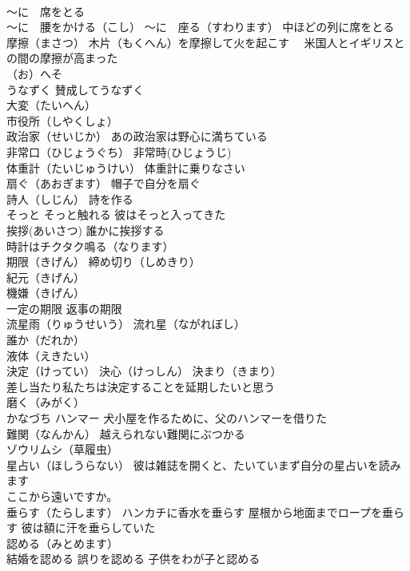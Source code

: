 \documentclass[8pt]{extreport}
\begin{document}
\begin{CJK}{UTF8}{min}
\\	～に　席をとる　
\\	～に　腰をかける（こし） ～に　座る（すわります） 中ほどの列に席をとる
\\	摩擦（まさつ） 木片（もくへん）を摩擦して火を起こす　 米国人とイギリスとの間の摩擦が高まった
\\	（お）へそ
\\	うなずく 賛成してうなずく
\\	大変（たいへん）
\\	市役所（しやくしょ）
\\	政治家（せいじか） あの政治家は野心に満ちている
\\	非常口（ひじょうぐち） 非常時(ひじょうじ)
\\	体重計（たいじゅうけい） 体重計に乗りなさい
\\	扇ぐ（あおぎます） 帽子で自分を扇ぐ
\\	詩人（しじん） 詩を作る
\\	そっと そっと触れる 彼はそっと入ってきた
\\	挨拶(あいさつ) 誰かに挨拶する
\\	時計はチクタク鳴る（なります）
\\	期限（きげん） 締め切り（しめきり）
\\	紀元（きげん）
\\	機嫌（きげん）
\\	一定の期限 返事の期限
\\	流星雨（りゅうせいう） 流れ星（ながれぼし）
\\	誰か（だれか）
\\	液体（えきたい）
\\	決定（けってい） 決心（けっしん） 決まり（きまり）
\\	差し当たり私たちは決定することを延期したいと思う
\\	磨く（みがく）
\\	かなづち ハンマー 犬小屋を作るために、父のハンマーを借りた
\\	難関（なんかん） 越えられない難関にぶつかる
\\	ゾウリムシ（草履虫）
\\	星占い（ほしうらない） 彼は雑誌を開くと、たいていまず自分の星占いを読みます
\\	ここから遠いですか。
\\	垂らす（たらします） ハンカチに香水を垂らす 屋根から地面までロープを垂らす 彼は額に汗を垂らしていた
\\	認める（みとめます） 
\\	結婚を認める 誤りを認める 子供をわが子と認める

\end{CJK}
\end{document}
